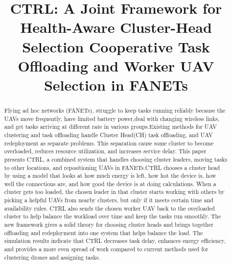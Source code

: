 \documentclass[journal]{IEEEtran}
\begin{document}


\title{CTRL: A Joint Framework for Health-Aware Cluster-Head Selection Cooperative Task Offloading and Worker UAV Selection in FANETs}

\author{
}
\maketitle

\begin{abstract}
Flying ad hoc networks (FANETs), struggle to keep tasks running reliably because the UAVs move frequently, have limited battery power,deal with changing wireless links, and get tasks arriving at different rate in various groups.Existing methods for UAV clustering and task offloading handle Cluster Head(CH) task offloading, and UAV redeployment as separate problems. This separation cause some cluster to become overloaded, reduces resource utilization, and increases service delay. This paper presents CTRL, a combined system that handles choosing cluster leaders, moving tasks to other locations, and repositioning UAVs in FANETs.CTRL chooses a cluster head by using a model that looks at how much energy is left, how hot the device is, how well the connections are, and how good the device is at doing calculations. When a cluster gets too loaded, the chosen leader in that cluster starts working with others by picking a helpful UAVs from nearby clusters, but only if it meets certain time and availability rules. CTRL also sends the chosen worker UAV back to the overloaded cluster to help balance the workload over time and keep the tasks run smoothly. The new framework gives a solid theory for choosing cluster heads and brings together offloading and redeployment into one system that helps balance the load. The simulation results indicate that CTRL decreases task delay, enhances energy efficiency, and provides a more even spread of work compared to current methods used for clustering drones and assigning tasks.
\end{abstract}
\end{document}
